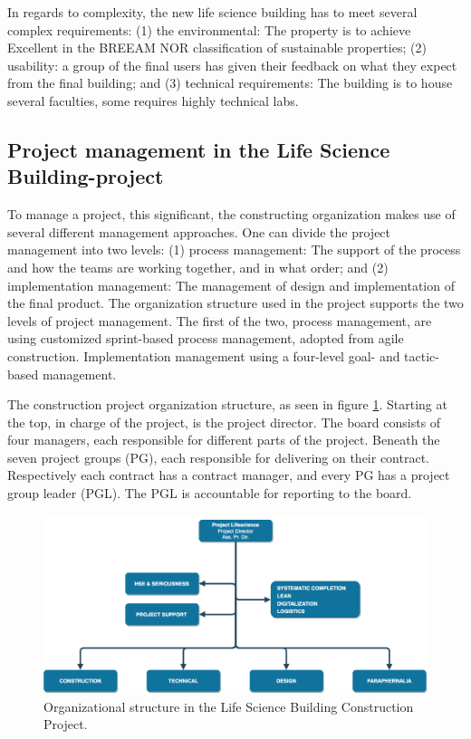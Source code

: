 In regards to complexity, the new life science building has to meet several complex requirements: (1) the environmental: The property is to achieve Excellent in the BREEAM NOR classification of sustainable properties; (2) usability: a group of the final users has given their feedback on what they expect from the final building; and (3) technical requirements: The building is to house several faculties, some requires highly technical labs.


\subsection{Project management in the Life Science Building-project}
To manage a project, this significant, the constructing organization makes use of several different management approaches. One can divide the project management into two levels: (1) process management: The support of the process and how the teams are working together, and in what order; and (2) implementation management: The management of design and implementation of the final product. The organization structure used in the project supports the two levels of project management. The first of the two, process management, are using customized sprint-based process management, adopted from agile construction. Implementation management using a four-level goal- and tactic-based management.  

The construction project organization structure, as seen in figure \ref{fig:project_structure}. Starting at the top, in charge of the project, is the project director. The board consists of four managers, each responsible for different parts of the project. Beneath the seven project groups (PG), each responsible for delivering on their contract. Respectively each contract has a contract manager, and every PG has a project group leader (PGL). The PGL is accountable for reporting to the board.

\begin{figure}
    \centering
    \includegraphics[width=\textwidth]{fig/lvb_diagram.png}
    \caption{Organizational structure in the Life Science Building Construction Project.}
    \label{fig:project_structure}
\end{figure}

